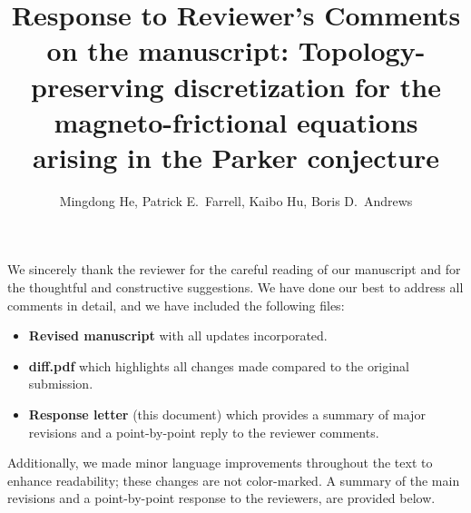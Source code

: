 \documentclass[12pt]{article}
\theoremstyle{definition}
\begin{document}

\title{Response to Reviewer's Comments on the manuscript: Topology-preserving discretization for
the magneto-frictional equations
arising in the Parker conjecture} %
\author{Mingdong He, Patrick E.~Farrell, Kaibo Hu, Boris D.~Andrews} 

\maketitle
We sincerely thank the reviewer for the careful reading of our manuscript and for the thoughtful and constructive suggestions. We have done our best to address all comments in detail, and we have included the following files:
\begin{itemize}
    \item \textbf{Revised manuscript} with all updates incorporated.
    \item \textbf{diff.pdf} which highlights all changes made compared to the original submission.
    \item \textbf{Response letter} (this document) which provides a summary of major revisions and a point-by-point reply to the reviewer comments. 
\end{itemize}
Additionally, we made minor language improvements throughout the text to enhance readability; these changes are not color-marked. A summary of the main revisions and a point-by-point response to the reviewers, are provided below.

\setlength{\parindent}{0pt}
\setlength{\parskip}{1em}
%
\end{document}
